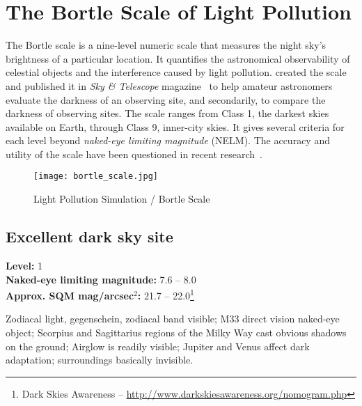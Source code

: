 
\chapter{The Bortle Scale of Light Pollution}
\label{ch:BortleScale}

The Bortle scale is a nine-level numeric scale that 
measures the night sky's brightness of a particular 
location. It quantifies the astronomical observability 
of celestial objects and the interference caused by 
light pollution.  created the 
scale and published it in \emph{Sky \& Telescope} 
magazine~\cite{Bortle} to help amateur astronomers evaluate the 
darkness of an observing site, and secondarily, 
to compare the darkness of observing sites. The 
scale ranges from Class 1, the darkest skies available 
on Earth, through Class 9, inner-city skies. 
It gives several criteria for each level beyond 
\emph{naked-eye limiting magnitude} (NELM). 
The accuracy and utility of the scale have been questioned in 
recent research~\cite{2014MNRAS.442.2600C}.

\begin{figure}[ht]\centering
\texttt{[image: bortle\_scale.jpg]}
\caption{Light Pollution Simulation / Bortle Scale}
\label{fig:BortleScale}
\end{figure}

\section{Excellent dark sky site}
\textbf{Level:} 1 \\
\textbf{Naked-eye limiting magnitude:} 7.6 -- 8.0 \\
\textbf{Approx. SQM mag/arcsec$^2$:} 21.7 -- 22.0\footnote{Dark Skies Awareness -- \url{http://www.darkskiesawareness.org/nomogram.php}}

Zodiacal light, gegenschein, zodiacal band visible; M33 direct vision
naked-eye object; Scorpius and Sagittarius regions of the Milky Way
cast obvious shadows on the ground; Airglow is readily visible;
Jupiter and Venus affect dark adaptation; surroundings basically
invisible.

